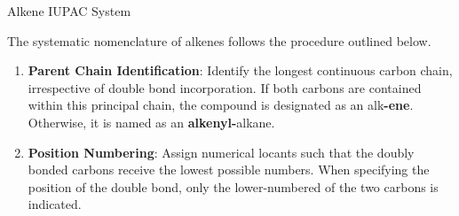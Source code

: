 \documentclass[10pt]{article}
\begin{document}
      \begin{core}[label=core:alkene_iupac]{Alkene IUPAC System}

        The systematic nomenclature of alkenes follows the procedure outlined below.

        \begin{enumerate}[label=(\arabic*)]

          \item \textbf{Parent Chain Identification}: Identify the longest continuous carbon chain, irrespective of double bond incorporation. If both  carbons are contained within this principal chain, the compound is designated as an alk\textbf{-ene}. Otherwise, it is named as an \textbf{alkenyl-}alkane.


          \item \textbf{Position Numbering}: Assign numerical locants such that the doubly bonded carbons receive the lowest possible numbers. When specifying the position of the double bond, only the lower-numbered of the two  carbons is indicated.


\end{enumerate}
\end{core}
\end{document}
